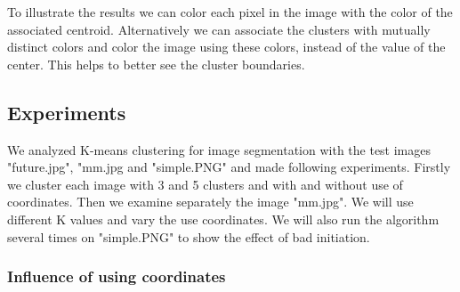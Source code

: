 To illustrate the results we can color each pixel in the image with the color of the associated centroid. Alternatively we can associate the clusters with mutually distinct colors and color the image using these colors, instead of the value of the center. This helps to better see the cluster boundaries.

\subsection{Experiments}

We analyzed K-means clustering for image segmentation with the test images "future.jpg", "mm.jpg and "simple.PNG" and made following experiments. Firstly we cluster each image with 3 and 5 clusters and with and without use of coordinates. Then we examine separately the image "mm.jpg". We will use different K values and vary the use coordinates. We will also run the algorithm several times on "simple.PNG" to show the effect of bad initiation.

\subsubsection{Influence of using coordinates}

